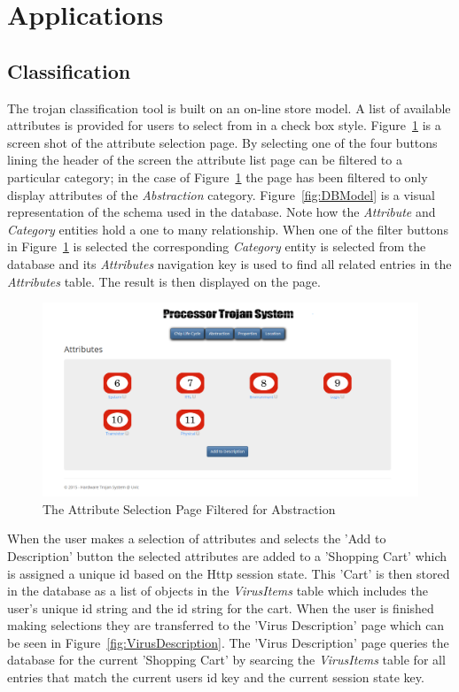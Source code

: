 \section{Applications}
\subsection{Classification} \label{Application:Classification}
The trojan classification tool is built on an on-line store model. A list of available attributes is provided for users to select from in a check box style. Figure~\ref{fig:attributeList} is a screen shot of the attribute selection page. By selecting one of the four buttons lining the header of the screen the attribute list page can be filtered to a particular category; in the case of Figure~\ref{fig:attributeList} the page has been filtered to only display attributes of the \textit{Abstraction} category. Figure~\ref{fig:DBModel} is a visual representation of the schema used in the database. Note how the \textit{Attribute} and \textit{Category} entities hold a one to many relationship. When one of the filter buttons in Figure~\ref{fig:attributeList} is selected the corresponding \textit{Category} entity is selected from the database and its \textit{Attributes} navigation key is used to find all related entries in the \textit{Attributes} table. The result is then displayed on the page.\newline
\begin{figure}
	\centering
	\includegraphics[width=.95\linewidth]{figures/attributeList}
	\caption[The Attribute Selection Page Filtered for Abstraction]{The Attribute Selection Page Filtered for Abstraction}
	\label{fig:attributeList}
\end{figure}

When the user makes a selection of attributes and selects the 'Add to Description' button the selected attributes are added to a 'Shopping Cart' which is assigned a unique id based on the Http session state. This 'Cart' is then stored in the database as a list of objects in the \textit{VirusItems} table which includes the user's unique id string and the id string for the cart. When the user is finished making selections they are transferred to the 'Virus Description' page which can be seen in Figure~\ref{fig:VirusDescription}. The 'Virus Description' page queries the database for the current 'Shopping Cart' by searcing the \textit{VirusItems} table for all entries that match the current users id key and the current session state key.\newline

